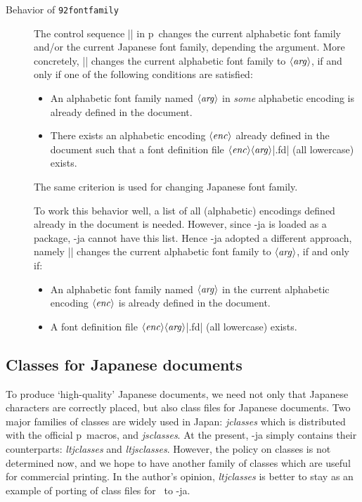 \documentclass{ajt}
\begin{document}
\begin{description}

\item[Behavior of\/ {\tt\char92fontfamily\/}]
The control sequence |\fontfamily| in p\LaTeXe\ changes the current alphabetic
	   font family and/or the current Japanese font family,
	   depending the argument. More concretely,
	   || changes the
	   current alphabetic font family to $\langle\hbox{\it
	   arg\/}\rangle$, if and only if one of the following
	   conditions are satisfied:
\begin{itemize}
\item An alphabetic font family named $\langle\hbox{\it arg\/}\rangle$ in
      \emph{some} alphabetic encoding is already defined in the document.
\item There exists an alphabetic encoding $\langle\hbox{\it
      enc\/}\rangle$ already defined in the document such that a font
      definition file $\langle\hbox{\it enc\/}\rangle\langle\hbox{\it
      arg\/}\rangle$|.fd| (all lowercase) exists.
\end{itemize}
The same criterion is used for changing Japanese font family.

To work this behavior well, a list of all (alphabetic) encodings defined
	   already in the document is needed. However, since \LuaTeX-ja
	   is loaded as a package, \LuaTeX-ja cannot have this list.
	   Hence \LuaTeX-ja adopted a different approach, namely
	   || changes the
	   current alphabetic font family to $\langle\hbox{\it
	   arg\/}\rangle$, if and only if:
\begin{itemize}
\item An alphabetic font family named $\langle\hbox{\it arg\/}\rangle$
      in the current alphabetic encoding $\langle\hbox{\it
      enc\/}\rangle$ is already defined in the document.
\item A  font definition file $\langle\hbox{\it enc\/}\rangle\langle\hbox{\it
      arg\/}\rangle$|.fd| (all lowercase) exists.
\end{itemize}


\end{description}



\subsection{Classes for Japanese documents}
To produce `high-quality' Japanese documents, we need not only that
Japanese characters are correctly placed, but also class files for
Japanese documents. Two major families of classes are widely used in Japan:
\emph{jclasses} which is distributed with the official p\LaTeXe\ macros,
and \emph{jsclasses}.  At the present, \LuaTeX-ja
simply contains their counterparts: \emph{ltjclasses} and
\emph{ltjsclasses}. However, the policy on classes is not determined
now, and we hope to have another family of classes which are useful for
commercial printing.  In the author's opinion, \emph{ltjclasses} is
better to stay as an example of porting of class files for \pTeX\ to
\LuaTeX-ja.
\end{document}
